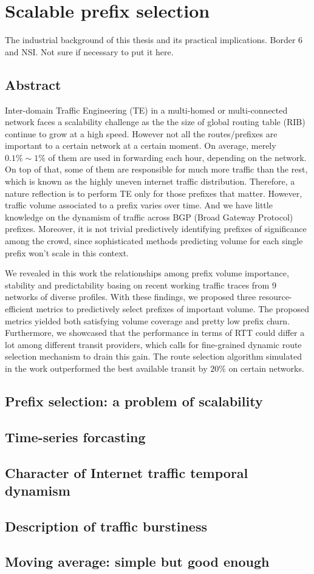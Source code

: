 \chapter{Scalable prefix selection}
\label{sec:pref_selec}
The industrial background of this thesis and its practical implications.
Border 6 and NSI. Not sure if necessary to put it here.

\section*{Abstract}
Inter-domain Traffic Engineering (TE) in a multi-homed or multi-connected network faces a scalability challenge as the the size of global routing table (RIB) continue to grow at a high speed. However not all the routes/prefixes are important to a certain network at a certain moment. On average, merely $0.1\% \sim 1\%$ of them are used in forwarding each hour, depending on the network. On top of that, some of them are responsible for much more traffic than the rest, which is known as the highly uneven internet traffic distribution.
Therefore, a nature reflection is to perform TE only for those prefixes that matter.
However, traffic volume associated to a prefix varies over time. And we have little knowledge on the dynamism of traffic across BGP (Broad Gateway Protocol) prefixes. 
Moreover, it is not trivial predictively identifying prefixes of significance among the crowd, since sophisticated methods predicting volume for each single prefix won't scale in this context.

We revealed in this work the relationships among prefix volume importance, stability and predictability basing on recent working traffic traces from 9 networks of diverse profiles. 
With these findings, we proposed three resource-efficient metrics to predictively select prefixes of important volume. The proposed metrics yielded both satisfying volume coverage and pretty low prefix churn. Furthermore, we showcased that the performance in terms of RTT could differ a lot among different transit providers, which calls for fine-grained dynamic route selection mechanism to drain this gain. The route selection algorithm simulated in the work outperformed the best available transit by $20\%$ on certain networks. 

\section{Prefix selection: a problem of scalability}

\section{Time-series forcasting}

\section{Character of Internet traffic temporal dynamism}

\section{Description of traffic burstiness}

\section{Moving average: simple but good enough}